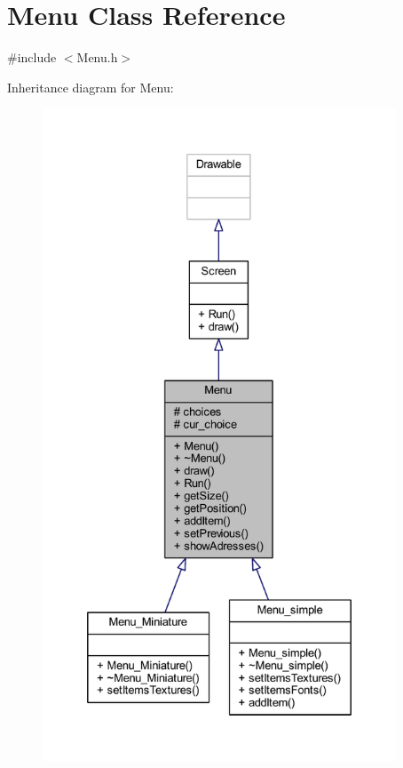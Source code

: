 \hypertarget{class_menu}{}\section{Menu Class Reference}
\label{class_menu}


{\ttfamily \#include $<$Menu.\+h$>$}



Inheritance diagram for Menu\+:
\nopagebreak
\begin{figure}[H]
\begin{center}
\leavevmode
\includegraphics[height=550pt]{class_menu__inherit__graph}
\end{center}
\end{figure}


